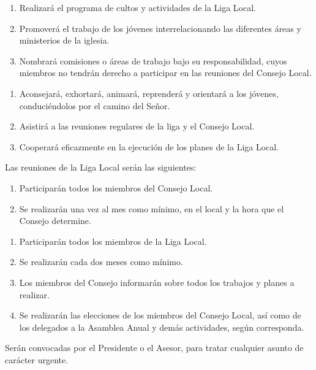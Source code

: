 \begin{enumerate}[noitemsep]
    \item Realizará el programa de cultos y actividades de la Liga Local.
    \item Promoverá el trabajo de los jóvenes interrelacionando las diferentes áreas y ministerios de la iglesia.
    \item Nombrará comisiones o áreas de trabajo bajo su responsabilidad, cuyos miembros no tendrán derecho a participar en las reuniones del Consejo Local.
\end{enumerate}

\begin{enumerate}[noitemsep]
    \item Aconsejará, exhortará, animará, reprenderá y orientará a los jóvenes, conduciéndolos por el camino del Señor.
    \item Asistirá a las reuniones regulares de la liga y el Consejo Local.
    \item Cooperará eficazmente en la ejecución de los planes de la Liga Local.
\end{enumerate}

\article
\label{reuniones-locales}
Las reuniones de la Liga Local serán las siguientes:

\begin{enumerate}[noitemsep]
    \item Participarán todos los miembros del Consejo Local.
    \item Se realizarán una vez al mes como mínimo, en el local y la hora que el Consejo determine.
\end{enumerate}

\begin{enumerate}[noitemsep]
    \item Participarán todos los miembros de la Liga Local.
    \item Se realizarán cada dos meses como mínimo.
    \item Los miembros del Consejo informarán sobre todos los trabajos y planes a realizar.
    \item Se realizarán las elecciones de los miembros del Consejo Local, así como de los delegados a la Asamblea Anual y demás actividades, según corresponda.
\end{enumerate}

Serán convocadas por el Presidente o el Asesor, para tratar cualquier asunto de carácter urgente.

